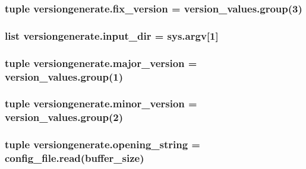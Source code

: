 \subsubsection[{fix\+\_\+version}]{\setlength{\rightskip}{0pt plus 5cm}tuple versiongenerate.\+fix\+\_\+version = version\+\_\+values.\+group(3)}\label{namespaceversiongenerate_a409471f03e765e6658400941518fde18}
\hypertarget{namespaceversiongenerate_a035dbc8bc18034df9f39d74ef7b63f04}{}
\subsubsection[{input\+\_\+dir}]{\setlength{\rightskip}{0pt plus 5cm}list versiongenerate.\+input\+\_\+dir = sys.\+argv\mbox{[}1\mbox{]}}\label{namespaceversiongenerate_a035dbc8bc18034df9f39d74ef7b63f04}
\hypertarget{namespaceversiongenerate_a792a7f9df0084617e1ddaf10548bbaf8}{}
\subsubsection[{major\+\_\+version}]{\setlength{\rightskip}{0pt plus 5cm}tuple versiongenerate.\+major\+\_\+version = version\+\_\+values.\+group(1)}\label{namespaceversiongenerate_a792a7f9df0084617e1ddaf10548bbaf8}
\hypertarget{namespaceversiongenerate_a09b0aa308f4f63c03e547bac116061f1}{}
\subsubsection[{minor\+\_\+version}]{\setlength{\rightskip}{0pt plus 5cm}tuple versiongenerate.\+minor\+\_\+version = version\+\_\+values.\+group(2)}\label{namespaceversiongenerate_a09b0aa308f4f63c03e547bac116061f1}
\hypertarget{namespaceversiongenerate_a6adb70bc03a954c71bcf964a1cb51523}{}
\subsubsection[{opening\+\_\+string}]{\setlength{\rightskip}{0pt plus 5cm}tuple versiongenerate.\+opening\+\_\+string = config\+\_\+file.\+read({\bf buffer\+\_\+size})}\label{namespaceversiongenerate_a6adb70bc03a954c71bcf964a1cb51523}
\hypertarget{namespaceversiongenerate_a66aeb3b9df50fe61aa16e436b75f5a9a}{}
